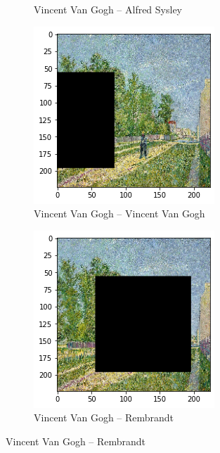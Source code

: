 \begin{figure}[H]
\begin{subfigure}{0.5\textwidth}
		\caption{Vincent Van Gogh -- Alfred Sysley}
		\label{fig:oc_mask_2}
	\end{subfigure}
	\begin{subfigure}{0.5\textwidth}
		\includegraphics[width=0.9\linewidth]{img/scratch/visualization/occlusion_mask_3.png} 
		\caption{Vincent Van Gogh -- Vincent Van Gogh}
		\label{fig:oc_mask_3}
	\end{subfigure}
	\begin{subfigure}{0.5\textwidth}
		\includegraphics[width=0.9\linewidth]{img/scratch/visualization/occlusion_mask_4.png} 
		\caption{Vincent Van Gogh -- Rembrandt}
		\label{fig:oc_mask_4}
	\end{subfigure}
\end{figure}

